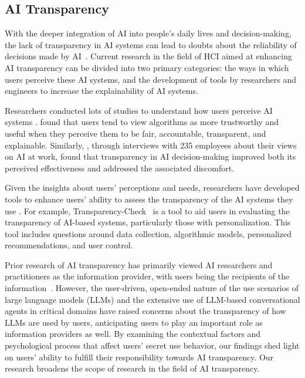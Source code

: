 \subsection{AI Transparency}

With the deeper integration of AI into people's daily lives and decision-making, the lack of transparency in AI systems can lead to doubts about the reliability of decisions made by AI~\cite{von2021transparency, larsson2020transparency, toy2023transparency, chander2018working}. 
Current research in the field of HCI aimed at enhancing AI transparency can be divided into two primary categories: the ways in which users perceive these AI systems, and the development of tools by researchers and engineers to increase the explainability of AI systems.

Researchers conducted lots of studies to understand how users perceive AI systems \cite{rzepka2018user, shin2020user, kocielnik2019will, shin2021effects}.
\citet{shin2021effects} found that users tend to view algorithms as more trustworthy and useful when they perceive them to be fair, accountable, transparent, and explainable.
Similarly, \citet{yu2022artificial}, through interviews with 235 employees about their views on AI at work, found that transparency in AI decision-making improved both its perceived effectiveness and addressed the associated discomfort.


Given the insights about users' perceptions and needs, researchers have developed tools to enhance users' ability to assess the transparency of the AI systems they use \cite{zhang2020lay, lundberg2019explainable, hu2021xaitk, karim2023explainable, dwivedi2023explainable}.
For example, Transparency-Check~\cite{schelenz2023transparency} is a tool to aid users in evaluating the transparency of AI-based systems, particularly those with personalization.
This tool includes questions around data collection, algorithmic models, personalized recommendations, and user control.


Prior research of AI transparency has primarily viewed AI researchers and practitioners as the information provider, with users being the recipients of the information~\cite{corbett2023interrogating}.
However, the user-driven, open-ended nature of the use scenarios of large language models (LLMs) and the extensive use of LLM-based conversational agents in critical domains have raised concerns about the transparency of how LLMs are used by users, anticipating users to play an important role as information providers as well.
By examining the contextual factors and psychological process that affect users' secret use behavior, our findings shed light on users' ability to fulfill their responsibility towards AI transparency.
Our research broadens the scope of research in the field of AI transparency.






